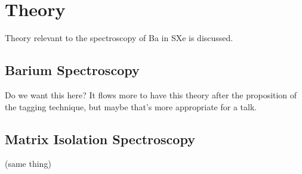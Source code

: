 \chapter{Theory}

Theory relevant to the spectroscopy of Ba in SXe is discussed.

\section{Barium Spectroscopy} 

Do we want this here?  It flows more to have this theory after the proposition of the tagging technique, but maybe that's more appropriate for a talk.

\section{Matrix Isolation Spectroscopy}

(same thing)

